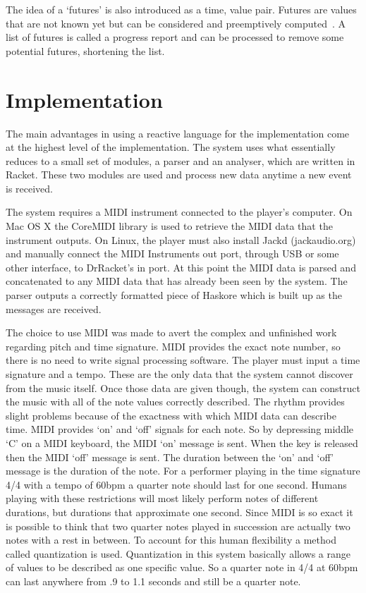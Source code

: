 \documentclass[12pt]{ucthesis}
\begin{document}

The idea of a `futures' is also introduced as a time, value pair. Futures are values that are not known yet but can be considered and preemptively computed~\cite{push-pull-frp}. A list of futures is called a progress report and can be processed to remove some potential futures, shortening the list.  

\chapter{Implementation}
\label{Implementation}
The main advantages in using a reactive language for the implementation come at the highest level of the implementation. The system uses what essentially reduces to a small set of modules, a parser and an analyser, which are written in Racket. These two modules are used and process new data anytime a new event is received. 

The system requires a MIDI instrument connected to the player's computer. On Mac OS X the CoreMIDI library is used to retrieve the MIDI data that the instrument outputs. On Linux, the player must also install Jackd (jackaudio.org) and manually connect the MIDI Instruments out port, through USB or some other interface, to DrRacket's in port. At this point the MIDI data is parsed and concatenated to any MIDI data that has already been seen by the system. The parser outputs a correctly formatted piece of Haskore which is built up as the messages are received. 

The choice to use MIDI was made to avert the complex and unfinished work regarding pitch and time signature.  MIDI provides the exact note number, so there is no need to write signal processing software. The player must input a time signature and a tempo. These are the only data that the system cannot discover from the music itself. Once those data are given though, the system can construct the music with all of the note values correctly described. The rhythm provides slight problems because of the exactness with which MIDI data can describe time. MIDI provides `on' and `off' signals for each note. So by depressing middle `C' on a MIDI keyboard, the MIDI `on' message is sent. When the key is released then the MIDI `off' message is sent. The duration between the `on' and `off' message is the duration of the note. For a performer playing in the time signature 4/4 with a tempo of 60bpm a quarter note should last for one second. Humans playing with these restrictions will most likely perform notes of different durations, but durations that approximate one second. Since MIDI is so exact it is possible to think that two quarter notes played in succession are actually two notes with a rest in between. To account for this human flexibility a method called quantization is used. Quantization in this system basically allows a range of values to be described as one specific value. So a quarter note in 4/4 at 60bpm can last anywhere from .9 to 1.1 seconds and still be a quarter note. 
\end{document}

